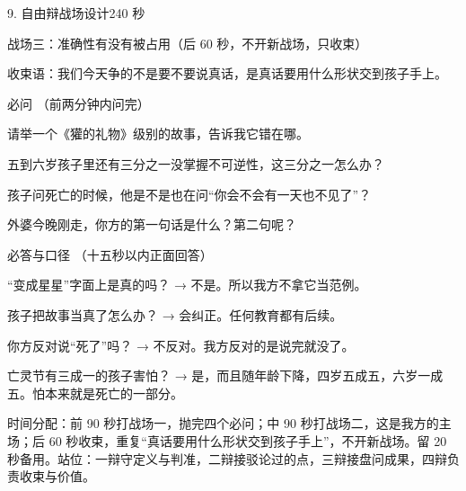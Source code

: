 \documentclass[script,con]{debate}
\begin{document}
\begin{stage}{9. 自由辩战场设计}{240 秒}
\begin{battleground}{战场三：准确性有没有被占用（后 60 秒，不开新战场，只收束）}
\begin{bullets}
\item 收束语：我们今天争的不是要不要说真话，是真话要用什么形状交到孩子手上。
\end{bullets}
\begin{points}{必问 （前两分钟内问完）}
\item 请举一个《獾的礼物》级别的故事，告诉我它错在哪。
\item 五到六岁孩子里还有三分之一没掌握不可逆性，这三分之一怎么办？
\item 孩子问死亡的时候，他是不是也在问“你会不会有一天也不见了”？
\item 外婆今晚刚走，你方的第一句话是什么？第二句呢？
\end{points}
\begin{points}{必答与口径 （十五秒以内正面回答）}
\item “变成星星”字面上是真的吗？ → 不是。所以我方不拿它当范例。
\item 孩子把故事当真了怎么办？ → 会纠正。任何教育都有后续。
\item 你方反对说“死了”吗？ → 不反对。我方反对的是说完就没了。
\item 亡灵节有三成一的孩子害怕？ → 是，而且随年龄下降，四岁五成五，六岁一成五。怕本来就是死亡的一部分。
\end{points}
时间分配：前 90 秒打战场一，抛完四个必问；中 90 秒打战场二，这是我方的主场；后 60 秒收束，重复“真话要用什么形状交到孩子手上”，不开新战场。留 20 秒备用。站位：一辩守定义与判准，二辩接驳论过的点，三辩接盘问成果，四辩负责收束与价值。

\end{battleground}
\end{stage}
\end{document}
